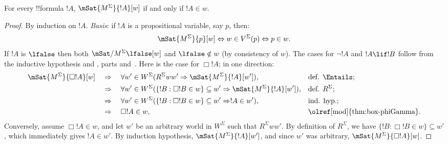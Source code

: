 \documentclass[../../../include/open-logic-section]{subfiles}
\begin{document}


\begin{prop}
  For every !!{formula} $!A$, $\mSat{M^\Sigma}{!A}[w]$ if and only if
  $!A \in w$.
\end{prop}

\begin{proof}
  By induction on $!A$. \emph{Basis}: if $!A$ is a
  propositional variable, say $p$, then:
  \[
  \mSat{M^\Sigma}{p}[w] \Leftrightarrow w \in V^\Sigma(p)
  \Leftrightarrow p \in w.
  \]
  If $!A$ is $\lfalse$ then both $\mSat/{M^\Sigma}{\lfalse}[w]$ and
  $\lfalse \notin w$ (by consistency of $w$). The cases for $\lnot !A$
  and $!A \lif !B$ follow from the inductive hypothesis and
  , parts
  and~. Here is the case for
  $\Box!A$; in one direction:
  \begin{align*}
    \mSat{M^\Sigma}{\Box!A}[w] & \quad \Rightarrow\quad \forall w'
    \in W^\Sigma (R^\Sigma ww' \Rightarrow \mSat{M^\Sigma}{!A}[w']),
    && \text{def. } \Entails; \\
    & \quad \Rightarrow\quad \forall w' \in W^\Sigma (\{!B :
    \Box!B \in w\}\subseteq w' \Rightarrow \mSat{M^\Sigma}{!A}[w']),
    && \text{def. } R^\Sigma; \\
    & \quad \Rightarrow\quad \forall w' \in W^\Sigma (\{!B :
    \Box!B \in w\}\subseteq w' \Rightarrow !A \in w'),
    && \text{ind. hyp.}; \\
    & \quad \Rightarrow\quad \Box!A \in w, &&
    \text{\olref[mod]{thm:box-phiGamma}}. 
  \end{align*}
  Conversely, assume $\Box!A \in w$, and let $w'$ be an arbitrary
  world in $W^\Sigma$ such that $R^\Sigma ww'$. By definition of
  $R^\Sigma$, we have $\{ !B : \Box!B \in w\} \subseteq w'$, which
  immediately gives $!A \in w'$. By induction hypothesis,
  $\mSat{M^\Sigma}{!A}[w']$, and since $w'$ was arbitrary,
  $\mSat{M^\Sigma}{\Box!A}[w]$.
\end{proof}
\end{document}
